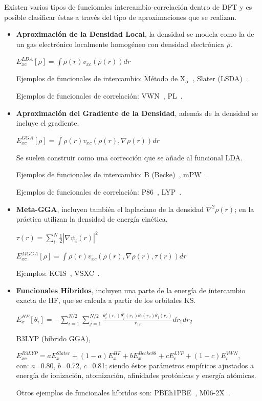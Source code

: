 Existen varios tipos de funcionales intercambio-correlación dentro de DFT y es
posible clasificar éstas a través del tipo de aproximaciones que se realizan.
%
\begin{itemize}

\item \textbf{Aproximación de la Densidad Local}, la densidad se modela como la de un gas
electrónico localmente homogéneo con densidad electrónica $\rho$.

$E_{xc}^{LDA} [\rho] = \int \rho (r) v_{xc}(\rho (r)) dr$

Ejemplos de funcionales de intercambio: Método de X$_{\alpha}$~\cite{Slater74},
Slater (LSDA)~\cite{Slater74}.

Ejemplos de funcionales de correlación: VWN~\cite{Vosko1980},
PL~\cite{Perdew1981}.
\item \textbf{Aproximación del Gradiente de la Densidad}, además de la densidad se incluye
el gradiente.

$E_{xc}^{GGA} [\rho] = \int \rho (r) v_{xc}(\rho (r), \nabla\rho (r)) dr$

Se suelen construir como una corrección que se añade al funcional LDA.

Ejemplos de funcionales de intercambio:
B (Becke)~\cite{Becke1988}, mPW~\cite{Adamo1998}.

Ejemplos de funcionales de correlación:
P86~\cite{Perdew1986}, LYP~\cite{Lee1988}.
\item \textbf{Meta-GGA}, incluyen también el laplaciano de la densidad $\nabla^{2}\rho (r)$; en
la práctica utilizan la densidad de energía cinética.

$\tau (r) = \displaystyle\sum_{i}^{N} \displaystyle\frac12 |\nabla\psi_i (r)|^{2}$

$E_{xc}^{MGGA} [\rho] =\int\rho (r) v_{xc}(\rho (r), \nabla\rho (r), \tau (r)) dr$

Ejemplos: KCIS~\cite{1999}, VSXC~\cite{VanVoorhis1998}.
\item \textbf{Funcionales Híbridos}, incluyen una parte de la energía de intercambio exacta de HF,
que se calcula a partir de los orbitales KS.

$E_{x}^{HF} [\theta_{i}] = -\displaystyle\sum_{i=1}^{N/2}\displaystyle\sum_{j=1}^{N/2}
\displaystyle\frac{\theta_{i}^{\star}(r_{1}) \theta_{j}^{\star}(r_{1}) \theta_{i}(r_{2}) \theta_{j}(r_{2})}
{r_{12}} dr_{1}dr_{2}$

B3LYP (híbrido GGA),

$E_{xc}^{B3LYP} = aE_{x}^{Slater} + (1-a)E_{x}^{HF} +bE_{x}^{Becke88}
+cE_{c}^{LYP} +(1-c)E_{c}^{VWN}$,\\
con: $a$=0.80, $b$=0.72, $c$=0.81; siendo éstos parámetros
empíricos ajustados a energía de ionización, atomización, afinidades protónicas y energía
atómicas.

Otros ejemplos de funcionales híbridos son: PBEh1PBE~\cite{Ernzerhof1998},
M06-2X~\cite{Zhao2007}.

\end{itemize}

